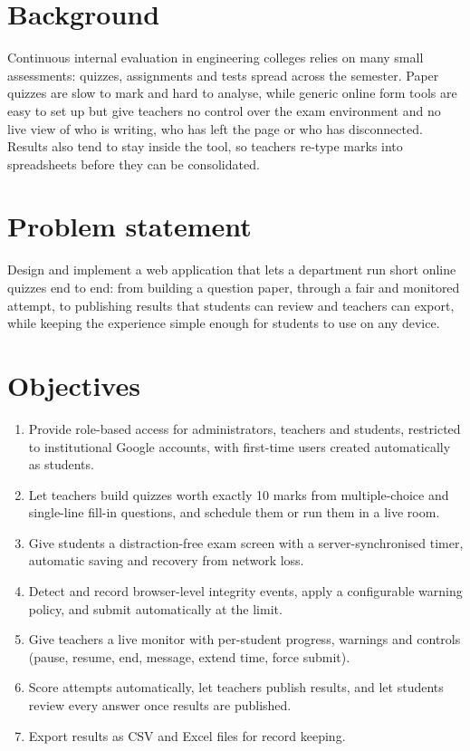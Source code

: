 \documentclass[12pt,a4paper,oneside]{report}
\begin{document}
\section{Background}
Continuous internal evaluation in engineering colleges relies on many small assessments: quizzes, assignments and
tests spread across the semester. Paper quizzes are slow to mark and hard to analyse, while generic online form tools
are easy to set up but give teachers no control over the exam environment and no live view of who is writing, who has
left the page or who has disconnected. Results also tend to stay inside the tool, so teachers re-type marks into
spreadsheets before they can be consolidated.

\section{Problem statement}
Design and implement a web application that lets a department run short online quizzes end to end: from building a
question paper, through a fair and monitored attempt, to publishing results that students can review and teachers can
export, while keeping the experience simple enough for students to use on any device.

\section{Objectives}
\begin{enumerate}
  \item Provide role-based access for administrators, teachers and students, restricted to institutional Google accounts, with first-time users created automatically as students.
  \item Let teachers build quizzes worth exactly 10 marks from multiple-choice and single-line fill-in questions, and schedule them or run them in a live room.
  \item Give students a distraction-free exam screen with a server-synchronised timer, automatic saving and recovery from network loss.
  \item Detect and record browser-level integrity events, apply a configurable warning policy, and submit automatically at the limit.
  \item Give teachers a live monitor with per-student progress, warnings and controls (pause, resume, end, message, extend time, force submit).
  \item Score attempts automatically, let teachers publish results, and let students review every answer once results are published.
  \item Export results as CSV and Excel files for record keeping.
\end{enumerate}
\end{document}
